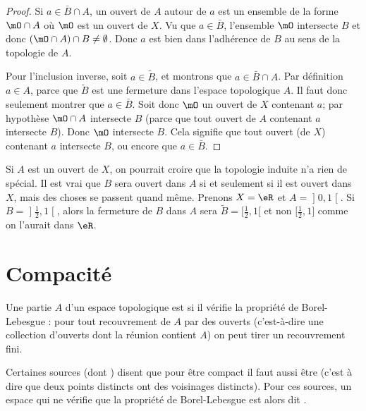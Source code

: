 \begin{proof}
    Si \( a\in \bar B\cap A\), un ouvert de \( A\) autour de \( a\) est un ensemble de la forme \( \mO\cap A\) où \( \mO\) est un ouvert de \( X\). Vu que \( a\in\bar B\), l'ensemble \( \mO\) intersecte \( B\) et donc \( (\mO\cap A)\cap B\neq \emptyset\). Donc \( a\) est bien dans l'adhérence de \( B\) au sens de la topologie de \( A\).

    Pour l'inclusion inverse, soit \( a\in \tilde  B\), et montrons que \( a\in \bar B\cap A\). Par définition \( a\in A\), parce que \( \tilde B\) est une fermeture dans l'espace topologique \( A\). Il faut donc seulement montrer que \( a\in\bar B\). Soit donc \( \mO\) un ouvert de \( X\) contenant \( a\); par hypothèse \( \mO\cap A\) intersecte \( B\) (parce que tout ouvert de \( A\) contenant \( a\) intersecte \( B\)). Donc \( \mO\) intersecte \( B\). Cela signifie que tout ouvert (de \( X\)) contenant \( a\) intersecte \( B\), ou encore que \( a\in \bar B\).
\end{proof}

\begin{example} \label{ExloeyoR}
    Si \( A\) est un ouvert de \( X\), on pourrait croire que la topologie induite n'a rien de spécial. Il est vrai que \( B\) sera ouvert dans \( A\) si et seulement si il est ouvert dans \( X\), mais des choses se passent quand même. Prenons \( X=\eR\) et \( A=\mathopen] 0 , 1 \mathclose[\). Si \( B=\mathopen] \frac{ 1 }{2} , 1 \mathclose[ \), alors la fermeture de \( B\) dans \( A\) sera \( \tilde B=\mathopen[ \frac{ 1 }{2} , 1 [\) et non \( \mathopen[ \frac{ 1 }{2} , 1 \mathclose]\) comme on l'aurait dans \( \eR\).
\end{example}

\section{Compacité}

\begin{definition}
  Une partie $A$ d'un espace topologique est  si il vérifie la propriété de Borel-Lebesgue : pour tout recouvrement de $A$ par des ouverts (c'est-à-dire une collection d'ouverts dont la réunion contient $A$) on peut tirer un recouvrement fini.
\end{definition}
\begin{remark}
    Certaines sources (dont ) disent que pour être compact il faut aussi être  (c'est à dire que deux points distincts ont des voisinages distincts). Pour ces sources, un espace qui ne vérifie que la propriété de Borel-Lebesgue est alors dit .
\end{remark}

